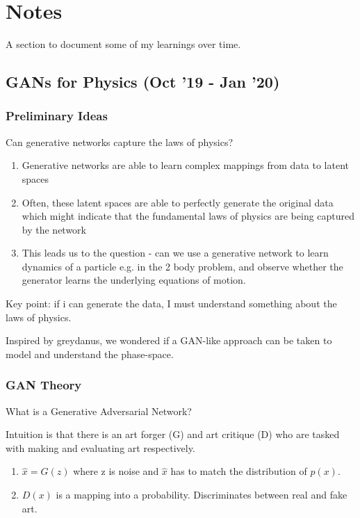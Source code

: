 \documentclass{article}
\begin{document}
\section{Notes}

A section to document some of my learnings over time.

\subsection{GANs for Physics (Oct '19 - Jan '20)}

\subsubsection*{Preliminary Ideas}

Can generative networks capture the laws of physics?

\begin{enumerate}
\item Generative networks are able to learn complex mappings from data to latent spaces
\item Often, these latent spaces are able to perfectly generate the original data which might indicate that the fundamental laws of physics are being captured by the network
\item This leads us to the question - can we use a generative network to learn dynamics of a particle e.g. in the 2 body problem, and observe whether the generator learns the underlying equations of motion.
\end{enumerate}
Key point: if i can generate the data, I must understand something about the laws of physics.

Inspired by greydanus, we wondered if a GAN-like approach can be taken to model and understand the phase-space.

\subsubsection*{GAN Theory}

What is a Generative Adversarial Network?

Intuition is that there is an art forger (G) and art critique (D) who are tasked with making and evaluating art respectively. 

\begin{enumerate}
\item $\hat{x} = G(z) $ where z is noise and $\hat{x}$ has to match the distribution of $p(x)$.

\item $D(x)$ is a mapping into a probability. Discriminates between real and fake art.
\end{enumerate}
\end{document}
